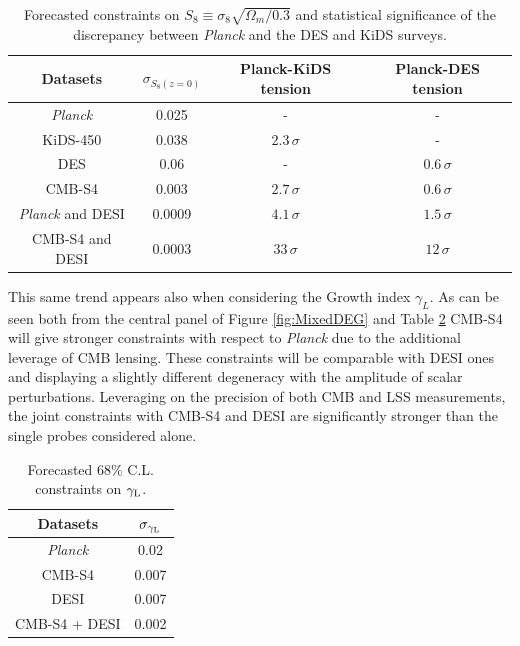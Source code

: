 \begin{table}[t!]
\begin{center}
\begin{tabular}{|c|c|c|c|} 
\hline
    				  Datasets 			& $\sigma_{S_8(z=0)}$  & Planck-KiDS tension & Planck-DES tension  \\
				  \hline
{\it Planck}  		& 		0.025	& - & -	\\
\hline
KiDS-450 		& 			0.038  	& $2.3 \, \sigma$ & -	\\
\hline
DES             &			0.06	 & - & $0.6 \, \sigma$	\\
\hline
CMB-S4       &			0.003  & 	$2.7 \, \sigma$ & $0.6 \, \sigma$	\\
\hline
{\it Planck} and DESI            &   0.0009	& 	$4.1 \, \sigma$ & $1.5 \, \sigma$	 \\
\hline
CMB-S4 and DESI  &   0.0003	 & 	$33 \, \sigma$ & $12 \, \sigma$			\\
\hline
\end{tabular}
\caption{Forecasted constraints on $S_8\equiv \sigma_8\sqrt{\Omega_m/0.3}$ and statistical significance of the discrepancy between {\it Planck} and the DES and KiDS surveys.}
\label{table:ForecastTensionS8}
\end{center}
\end{table}

This same trend appears also when considering the Growth index $\gamma_{L}$. As can be seen both from the central panel of Figure \ref{fig:MixedDEG} and Table \ref{table:ForecastTensionS8} CMB-S4 will give stronger constraints with respect to {\it Planck} due to the additional leverage of CMB lensing. These constraints will be comparable with DESI ones and displaying a slightly different degeneracy with the amplitude of scalar perturbations.
Leveraging on the precision of both CMB and LSS measurements, the joint constraints with CMB-S4 and DESI are significantly stronger than the single probes considered alone.

\begin{table}[t!]
\begin{center}
\begin{tabular}{|c|c|} 
\hline
Datasets 			& $\sigma_{\gamma_{\rm L}}$  \\
\hline
{\it Planck}  		& 		0.02	\\
\hline
CMB-S4       &			0.007  	\\
\hline
DESI            &   0.007	 \\
\hline
CMB-S4 + DESI  &   0.002	 \\
\hline
\end{tabular}
\caption{Forecasted $68\%$ C.L. constraints on $\gamma_{\rm L}$.}
\label{table:ForecastTensionS8}
\end{center}
\end{table}



